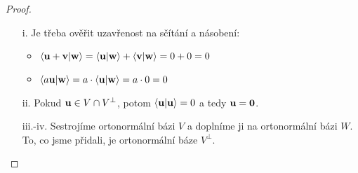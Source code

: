 \begin{proof}
    \leavevmode
    \begin{enumerate}
        \item[i.] Je třeba ověřit uzavřenost na sčítání a násobení:
            \begin{itemize}
                \item $\langle \mathbf{u} + \mathbf{v} | \mathbf{w} \rangle = \langle \mathbf{u} | \mathbf{w} \rangle + 
                    \langle \mathbf{v} | \mathbf{w} \rangle = 0 + 0 = 0$
                \item $\langle a\mathbf{u} | \mathbf{w} \rangle = a\cdot \langle \mathbf{u} | \mathbf{w} \rangle
                    = a\cdot0 = 0$
            \end{itemize}
        \item[ii.] Pokud $\mathbf{u} \in V \cap V^\bot$, potom $\langle \mathbf{u} | \mathbf{u} \rangle = 0$
            a tedy $\mathbf{u} = \mathbf{0}$.
        \item[iii.-iv.] Sestrojíme ortonormální bázi $V$ a doplníme ji
            na ortonormální bázi $W$. To, co jsme přidali, je ortonormální
            báze $V^\bot$.
    \end{enumerate}
\end{proof}
